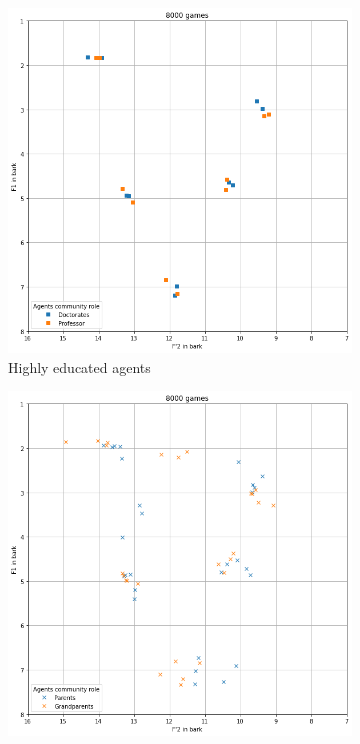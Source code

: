 \begin{figure}[ht]
\begin{subfigure}{.30\textwidth}
        \centering
        \includegraphics[width=\textwidth]{images/extension/sample_high.png}
        \captionsetup{width=0.9\linewidth}
        \captionsetup{justification=centering}
        \caption{Highly educated agents}
    \end{subfigure}
    \hspace{0.5cm}
    \begin{subfigure}{.30\textwidth}
        \centering
        \includegraphics[width=\textwidth]{images/extension/sample_regular.png}

\end{subfigure}
\end{figure}
